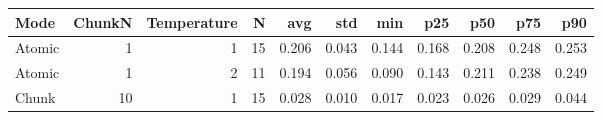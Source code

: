 \normalsize
\setlength{\tabcolsep}{3pt}
\begin{tabular}{lrrrrrrrrrr}
\toprule
Mode & ChunkN & Temperature & N & avg & std & min & p25 & p50 & p75 & p90 \\
\midrule
Atomic & 1 & 1 & 15 & 0.206 & 0.043 & 0.144 & 0.168 & 0.208 & 0.248 & 0.253 \\
Atomic & 1 & 2 & 11 & 0.194 & 0.056 & 0.090 & 0.143 & 0.211 & 0.238 & 0.249 \\
Chunk & 10 & 1 & 15 & 0.028 & 0.010 & 0.017 & 0.023 & 0.026 & 0.029 & 0.044 \\
\bottomrule
\end{tabular}
